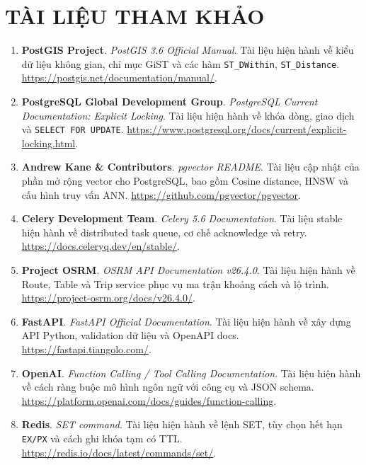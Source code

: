 \documentclass[12pt, a4paper]{article}
\begin{document}
\section*{TÀI LIỆU THAM KHẢO}
\begin{enumerate}
\renewcommand{\labelenumi}{[\arabic{enumi}]}
    \item \textbf{PostGIS Project}. \textit{PostGIS 3.6 Official Manual}. Tài liệu hiện hành về kiểu dữ liệu không gian, chỉ mục GiST và các hàm \texttt{ST\_DWithin}, \texttt{ST\_Distance}. \url{https://postgis.net/documentation/manual/}.
    \item \textbf{PostgreSQL Global Development Group}. \textit{PostgreSQL Current Documentation: Explicit Locking}. Tài liệu hiện hành về khóa dòng, giao dịch và \texttt{SELECT FOR UPDATE}. \url{https://www.postgresql.org/docs/current/explicit-locking.html}.
    \item \textbf{Andrew Kane \& Contributors}. \textit{pgvector README}. Tài liệu cập nhật của phần mở rộng vector cho PostgreSQL, bao gồm Cosine distance, HNSW và cấu hình truy vấn ANN. \url{https://github.com/pgvector/pgvector}.
    \item \textbf{Celery Development Team}. \textit{Celery 5.6 Documentation}. Tài liệu stable hiện hành về distributed task queue, cơ chế acknowledge và retry. \url{https://docs.celeryq.dev/en/stable/}.
    \item \textbf{Project OSRM}. \textit{OSRM API Documentation v26.4.0}. Tài liệu hiện hành về Route, Table và Trip service phục vụ ma trận khoảng cách và lộ trình. \url{https://project-osrm.org/docs/v26.4.0/}.
    \item \textbf{FastAPI}. \textit{FastAPI Official Documentation}. Tài liệu hiện hành về xây dựng API Python, validation dữ liệu và OpenAPI docs. \url{https://fastapi.tiangolo.com/}.
    \item \textbf{OpenAI}. \textit{Function Calling / Tool Calling Documentation}. Tài liệu hiện hành về cách ràng buộc mô hình ngôn ngữ với công cụ và JSON schema. \url{https://platform.openai.com/docs/guides/function-calling}.
    \item \textbf{Redis}. \textit{SET command}. Tài liệu hiện hành về lệnh SET, tùy chọn hết hạn \texttt{EX/PX} và cách ghi khóa tạm có TTL. \url{https://redis.io/docs/latest/commands/set/}.
\end{enumerate}
\end{document}
